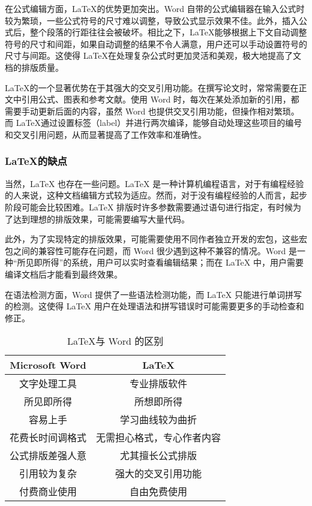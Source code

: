 在公式编辑方面，\LaTeX 的优势更加突出。Word 自带的公式编辑器在输入公式时较为繁琐，一些公式符号的尺寸难以调整，导致公式显示效果不佳。此外，插入公式后，整个段落的行距往往会被破坏。相比之下，\LaTeX 能够根据上下文自动调整符号的尺寸和间距，如果自动调整的结果不令人满意，用户还可以手动设置符号的尺寸与间距。这使得 \LaTeX 在处理复杂公式时更加灵活和美观，极大地提高了文档的排版质量。

\LaTeX 的一个显著优势在于其强大的交叉引用功能。在撰写论文时，常常需要在正文中引用公式、图表和参考文献。使用 Word 时，每次在某处添加新的引用，都需要手动更新后面的内容，虽然 Word 也提供交叉引用功能，但操作相对繁琐。而 \LaTeX 通过设置标签（label）并进行两次编译，能够自动处理这些项目的编号和交叉引用问题，从而显著提高了工作效率和准确性。


\subsubsection{\LaTeX 的缺点}
当然，LaTeX 也存在一些问题。LaTeX 是一种计算机编程语言，对于有编程经验的人来说，这种文档编辑方式较为适应。然而，对于没有编程经验的人而言，起步阶段可能会比较困难。LaTeX 排版时许多参数需要通过语句进行指定，有时候为了达到理想的排版效果，可能需要编写大量代码。

此外，为了实现特定的排版效果，可能需要使用不同作者独立开发的宏包，这些宏包之间的兼容性可能存在问题，而 Word 很少遇到这种不兼容的情况。Word 是一种“所见即所得”的系统，用户可以实时查看编辑结果；而在 LaTeX 中，用户需要编译文档后才能看到最终效果。

在语法检测方面，Word 提供了一些语法检测功能，而 LaTeX 只能进行单词拼写的检测。这使得 LaTeX 用户在处理语法和拼写错误时可能需要更多的手动检查和修正。

\begin{table}[H]
\caption{ \LaTeX 与 Word 的区别}
\centering
\begin{tabular}{cc}
\toprule
Microsoft Word & \LaTeX \\
\midrule
文字处理工具&专业排版软件\\
所见即所得&所想即所得 \\
容易上手&学习曲线较为曲折 \\
花费长时间调格式&无需担心格式，专心作者内容 \\
公式排版差强人意&尤其擅长公式排版 \\
引用较为复杂&强大的交叉引用功能 \\
付费商业使用&自由免费使用 \\
\bottomrule
\end{tabular}
\end{table}




